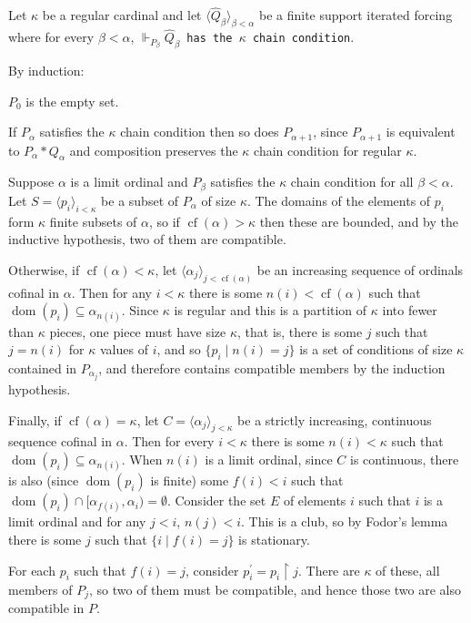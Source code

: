 \documentclass[12pt]{article}
\begin{document}
Let $\kappa$ be a regular cardinal and let $\langle\hat{Q}_\beta\rangle_{\beta<\alpha}$ be a finite support iterated forcing where for every $\beta<\alpha$, $\Vdash_{P_\beta} \hat{Q}_\beta$\texttt{ has the }$\kappa$\texttt{ chain condition}.

By induction:

$P_0$ is the empty set.

If $P_\alpha$ satisfies the $\kappa$ chain condition then so does $P_{\alpha+1}$, since $P_{\alpha+1}$ is equivalent to $P_\alpha*Q_\alpha$ and composition preserves the $\kappa$ chain condition for regular $\kappa$.

Suppose $\alpha$ is a limit ordinal and $P_\beta$ satisfies the $\kappa$ chain condition for all $\beta<\alpha$.  Let $S=\langle p_i\rangle_{i<\kappa}$ be a subset of $P_{\alpha}$ of size $\kappa$.  The domains of the elements of $p_i$ form $\kappa$ finite subsets of $\alpha$, so if $\operatorname{cf}(\alpha)>\kappa$ then these are bounded, and by the inductive hypothesis, two of them are compatible.

Otherwise, if $\operatorname{cf}(\alpha)<\kappa$, let $\langle \alpha_j\rangle_{j<\operatorname{cf}(\alpha)}$ be an increasing sequence of ordinals cofinal in $\alpha$.  Then for any $i<\kappa$ there is some $n(i)<\operatorname{cf}(\alpha)$ such that $\operatorname{dom}(p_i)\subseteq \alpha_{n(i)}$.  Since $\kappa$ is regular and this is a partition of $\kappa$ into fewer than $\kappa$ pieces, one piece must have size $\kappa$, that is, there is some $j$ such that $j=n(i)$ for $\kappa$ values of $i$, and so $\{p_i\mid n(i)=j\}$ is a set of conditions of size $\kappa$ contained in $P_{\alpha_j}$, and therefore contains compatible members by the induction hypothesis.

Finally, if $\operatorname{cf}(\alpha)=\kappa$, let $C=\langle \alpha_j\rangle_{j<\kappa}$ be a strictly increasing, continuous sequence cofinal in $\alpha$.  Then for every $i<\kappa$ there is some $n(i)<\kappa$ such that $\operatorname{dom}(p_i)\subseteq \alpha_{n(i)}$.  When $n(i)$ is a limit ordinal, since $C$ is continuous, there is also (since $\operatorname{dom}(p_i)$ is finite) some $f(i)<i$ such that $\operatorname{dom}(p_i)\cap [\alpha_{f(i)},\alpha_i)=\emptyset$.  Consider the set $E$ of elements $i$ such that $i$ is a limit ordinal and for any $j<i$, $n(j)<i$.  This is a club, so by Fodor's lemma there is some $j$ such that $\{i\mid f(i)=j\}$ is stationary.

For each $p_i$ such that $f(i)=j$, consider $p^\prime_i=p_i\upharpoonright j$.  There are $\kappa$ of these, all members of $P_j$, so two of them must be compatible, and hence those two are also compatible in $P$.
\end{document}

